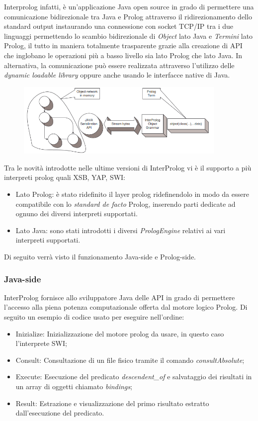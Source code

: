 Interprolog infatti, è un'applicazione Java open source in grado di permettere una comunicazione bidirezionale tra Java e Prolog attraverso il ridirezionamento dello standard output instaurando una connessione con socket TCP/IP tra i due linguaggi permettendo lo scambio bidirezionale di \emph{Object} lato Java e \emph{Termini} lato Prolog, il tutto in maniera totalmente trasparente grazie alla creazione di API che inglobano le operazioni più a basso livello sia lato Prolog che lato Java. In alternativa, la comunicazione può essere realizzata attraverso l'utilizzo delle \emph{dynamic loadable library} oppure anche usando le interfacce native di Java.

\begin{figure}[H]
	\centering
	\includegraphics[width=0.9\textwidth]{img/InterPrologSystem.png}
\end{figure}

Tra le novità introdotte nelle ultime versioni di InterProlog vi è il supporto a più interpreti prolog quali XSB, YAP, SWI:
\begin{itemize}
	\item Lato Prolog: è stato ridefinito il layer prolog ridefinendolo in modo da essere compatibile con lo \emph{standard de facto} Prolog, inserendo parti dedicate ad ognuno dei diversi interpreti supportati.
	\item Lato Java: sono stati introdotti i diversi \emph{PrologEngine} relativi ai vari interpreti supportati.
\end{itemize}

Di seguito verrà visto il funzionamento Java-side e Prolog-side.
\subsubsection*{Java-side}
InterProlog fornisce allo sviluppatore Java delle API in grado di permettere l'accesso alla piena potenza computazionale offerta dal motore logico Prolog. Di seguito un esempio di codice usato per eseguire nell'ordine:
\begin{itemize}
	\item Inizialize: Inizializzazione del motore prolog da usare, in questo caso l'interprete SWI;
	\item Consult: Consultazione di un file fisico tramite il comando \emph{consultAbsolute};
	\item Execute: Esecuzione del predicato \emph{descendent\_of} e salvataggio dei risultati in un array di oggetti chiamato \emph{bindings};
	\item Result: Estrazione e visualizzazione del primo risultato estratto dall'esecuzione del predicato.
\end{itemize}

